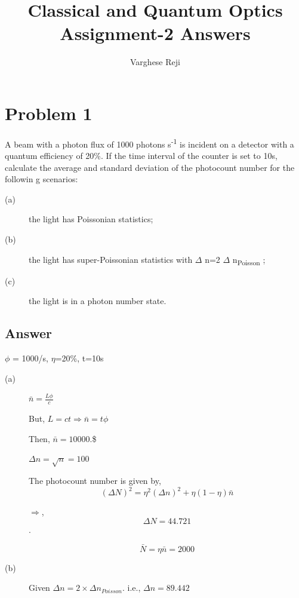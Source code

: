 \documentclass[a4paper,11pt]{article}
\author{Varghese Reji}
\date{}
\title{Classical and Quantum Optics\\\medskip
\large Assignment-2 Answers}
\begin{document}
\maketitle

\section*{Problem 1}
\label{sec:orgce068e2}

A beam with a photon flux of 1000 photons s\textsuperscript{-1} is incident on a detector with a quantum efficiency of 20\%. If the time interval of the counter is set to 10s, calculate the average and standard deviation of the photocount number for the followin g scenarios:
\begin{description}
\item[{(a)}] the light has Poissonian statistics;
\item[{(b)}] the light has super-Poissonian statistics with \(\Delta\) n=2\texttimes{} \(\Delta\) n\textsubscript{Poisson} ;
\item[{(c)}] the light is in a photon number state.
\end{description}

\subsection*{Answer}
\label{sec:orga615958}
\(\phi\) = 1000/s, \(\eta\)=20\%, t=10s

\begin{description}
\item[{(a)}] \(\bar{n} = \frac{L \phi}{c}\)

But, \(L=ct \Rightarrow \bar{n} = t \phi\)

Then, \(\bar{n} = 10000\).\$

\(\Delta n = \sqrt{n} = 100\)

The photocount number is given by, $$(\Delta N)^2 = \eta^2(\Delta n)^2 + \eta(1-\eta) \bar{n}$$

\(\Rightarrow\), $$\Delta N = 44.721$$.

$$\bar{N} = \eta \bar{n} = 2000$$
\end{description}


\begin{description}
\item[{(b)}] Given \(\Delta n = 2\times \Delta n_{Poisson}\).
i.e., \(\Delta n = 89.442\)
\end{description}
\end{document}
